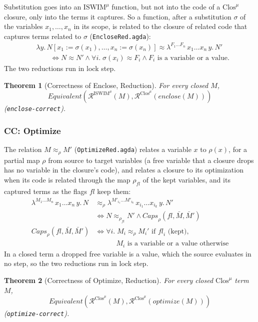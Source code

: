 \documentclass[10pt]{article}
\theoremstyle{acmplain}
\newtheorem{theorem}{Theorem}[section]
\newcommand{\pass}[1]{\mathit{#1}}
\newcommand{\lam}[1]{\lambda #1.\,}
\newcommand{\clos}[2]{\lambda^{#1}\, #2.\,}
\newcommand{\Equiv}{\mathit{Equivalent}}
\newcommand{\Ml}[1]{\textrm{#1}^{\mu}}                  %
\begin{document}
Substitution goes into an $\Ml{ISWIM}$ function, but not into the code of a
$\Ml{Clos}$ closure, only into the terms it captures. So a function, after a
substitution $\sigma$ of the variables $x_1, \ldots, x_n$ in its scope, is
related to the closure of related code that captures terms related to
$\sigma$ (\texttt{EncloseRed.agda}):
\begin{align*}
  &\lam{y} N[x_1 := \sigma(x_1), \ldots, x_n := \sigma(x_n)] \approx
    \clos{F_1\ldots F_n}{x_1\ldots x_n\, y} N' \\
  &\qquad\iff N \approx N' \land \forall i.\; \sigma(x_i) \approx F_i \land F_i \text{ is a variable or a value} .
\end{align*}
The two reductions run in lock step.
\begin{theorem}[Correctness of Enclose, Reduction]\label{thm:m-red-enclose}
For every closed $M$,
\[ \Equiv(\mathcal{R}^{\Ml{ISWIM}}(M), \mathcal{R}^{\Ml{Clos}}(\pass{enclose}(M))) \]
(\texttt{enclose-correct}).
\end{theorem}

\subsubsection{CC: Optimize}

The relation $M \approx_\rho M'$ (\texttt{OptimizeRed.agda}) relates a
variable $x$ to $\rho(x)$, for a partial map $\rho$ from source to target
variables (a free variable that a closure drops has no variable in the
closure's code), and relates a closure to its optimization when its code is
related through the map $\rho_{\mathit{fl}}$ of the kept variables, and its
captured terms as the flags $\mathit{fl}$ keep them:
\begin{align*}
  \clos{M_1\ldots M_n}{x_1\ldots x_n\, y} N &\approx_\rho
    \clos{M'_{i_1}\ldots M'_{i_k}}{x_{i_1}\ldots x_{i_k}\, y} N' \\
  &\iff N \approx_{\rho_{\mathit{fl}}} N' \land \mathit{Caps}_\rho(\mathit{fl}, \bar{M}, \bar{M}') \\
  \mathit{Caps}_\rho(\mathit{fl}, \bar{M}, \bar{M}') &\iff
    \forall i.\; M_i \approx_\rho M_i' \text{ if } \mathit{fl}_i \text{ (kept)}, \\
  &\qquad\quad M_i \text{ is a variable or a value otherwise}
\end{align*}
In a closed term a dropped free variable is a value, which the source
evaluates in no step, so the two reductions run in lock step.
\begin{theorem}[Correctness of Optimize, Reduction]\label{thm:m-red-optimize}
For every closed $\Ml{Clos}$ term $M$,
\[ \Equiv(\mathcal{R}^{\Ml{Clos}}(M), \mathcal{R}^{\Ml{Clos}}(\pass{optimize}(M))) \]
(\texttt{optimize-correct}).
\end{theorem}
\end{document}
